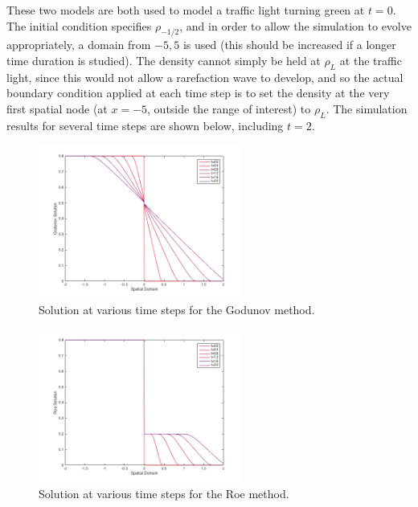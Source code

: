 \documentclass[10pt]{article}
\begin{document}
These two models are both used to model a traffic light turning green at \(t=0\). The initial condition specifies \(\rho_{-1/2}\), and in order to allow the simulation to evolve appropriately, a domain from \(-5,5\) is used (this should be increased if a longer time duration is studied). The density cannot simply be held at \(\rho_L\) at the traffic light, since this would not allow a rarefaction wave to develop, and so the actual boundary condition applied at each time step is to set the density at the very first spatial node (at \(x=-5\), outside the range of interest) to \(\rho_L\). The simulation results for several time steps are shown below, including \(t=2\). 

\begin{figure}[H]
\centering
\includegraphics[width=0.6\textwidth]{figures/godunov1.png}
\caption{Solution at various time steps for the Godunov method.}
\end{figure}

\begin{figure}[H]
\centering
\includegraphics[width=0.6\textwidth]{figures/roe1.png}
\caption{Solution at various time steps for the Roe method.}
\end{figure}
\end{document}
